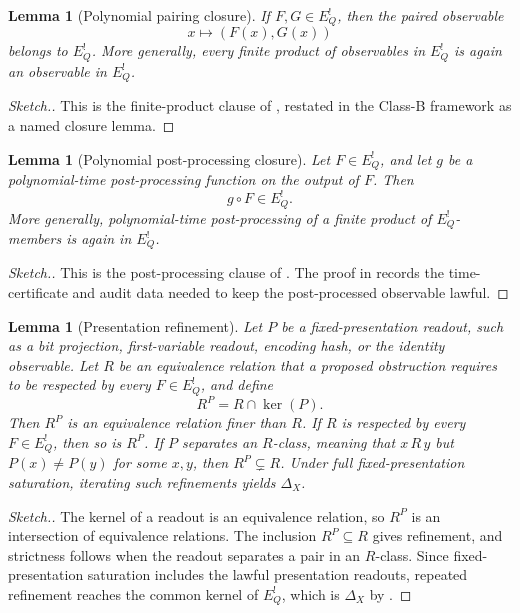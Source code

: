 \documentclass[11pt]{article}
\newcommand{\EQbang}{E^{!}_{Q}}
\newtheorem{lemma}[theorem]{Lemma}
\theoremstyle{definition}
\begin{document}
\begin{lemma}[Polynomial pairing closure]
\label{lem:pvnp:polynomial-pairing-closure}
If \(F,G\in\EQbang\), then the paired observable
\[
  x\longmapsto (F(x),G(x))
\]
belongs to \(\EQbang\).  More generally, every finite product of
observables in \(\EQbang\) is again an observable in \(\EQbang\).
\end{lemma}

\begin{proof}[Sketch.]
This is the finite-product clause of
, restated in the Class-B
framework as a named closure lemma.
\end{proof}

\begin{lemma}[Polynomial post-processing closure]
\label{lem:pvnp:polynomial-postprocessing-closure}
Let \(F\in\EQbang\), and let \(g\) be a polynomial-time
post-processing function on the output of \(F\).  Then
\[
  g\circ F\in\EQbang .
\]
More generally, polynomial-time post-processing of a finite product of
\(\EQbang\)-members is again in \(\EQbang\).
\end{lemma}

\begin{proof}[Sketch.]
This is the post-processing clause of
.  The proof in
 records the time-certificate and
audit data needed to keep the post-processed observable lawful.
\end{proof}

\begin{lemma}[Presentation refinement]
\label{lem:pvnp:presentation-refinement}
Let \(P\) be a fixed-presentation readout, such as a bit projection,
first-variable readout, encoding hash, or the identity observable.
Let \(R\) be an equivalence relation that a proposed obstruction
requires to be respected by every \(F\in\EQbang\), and define
\[
  R^P = R\cap \ker(P).
\]
Then \(R^P\) is an equivalence relation finer than \(R\).  If \(R\) is
respected by every \(F\in\EQbang\), then so is \(R^P\).  If \(P\)
separates an \(R\)-class, meaning that \(x\,R\,y\) but
\(P(x)\neq P(y)\) for some \(x,y\), then \(R^P\subsetneq R\).  Under
full fixed-presentation saturation, iterating such refinements yields
\(\Delta_X\).
\end{lemma}

\begin{proof}[Sketch.]
The kernel of a readout is an equivalence relation, so \(R^P\) is an
intersection of equivalence relations.  The inclusion \(R^P\subseteq R\)
gives refinement, and strictness follows when the readout separates a
pair in an \(R\)-class.  Since fixed-presentation saturation includes
the lawful presentation readouts, repeated refinement reaches the
common kernel of \(\EQbang\), which is \(\Delta_X\) by
.
\end{proof}
\end{document}
